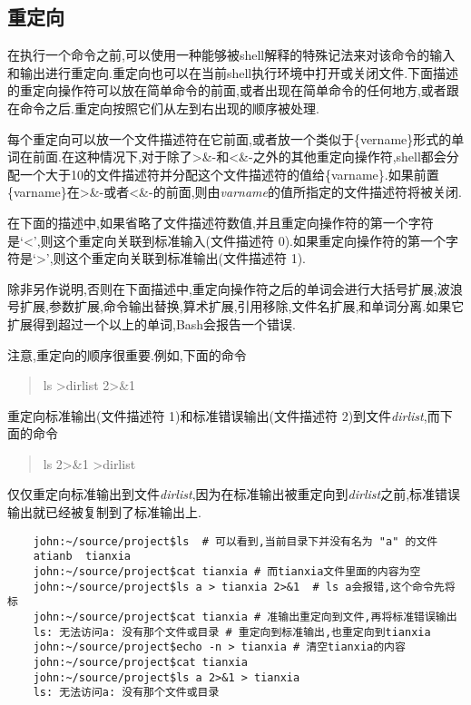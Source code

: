 \documentclass[draft,openany]{book}
\begin{document}
\begin{CJK}{UTF8}{gbsn}
    \section{重定向}
    在执行一个命令之前,可以使用一种能够被shell解释的特殊记法来对该命令的输入和输出进行重定向.重定向也可以在当前shell执行环境中打开或关闭文件.下面描述的重定向操作符可以放在简单命令的前面,或者出现在简单命令的任何地方,或者跟在命令之后.重定向按照它们从左到右出现的顺序被处理.\par
    每个重定向可以放一个文件描述符在它前面,或者放一个类似于\{vername\}形式的单词在前面.在这种情况下,对于除了\textgreater\&-和\textless\&-之外的其他重定向操作符,shell都会分配一个大于10的文件描述符并分配这个文件描述符的值给\{varname\}.如果前置\{varname\}在\textgreater\&-或者\textless\&-的前面,则由\emph{varname}的值所指定的文件描述符将被关闭.\par
    在下面的描述中,如果省略了文件描述符数值,并且重定向操作符的第一个字符是`\textless',则这个重定向关联到标准输入(文件描述符 0).如果重定向操作符的第一个字符是`\textgreater',则这个重定向关联到标准输出(文件描述符 1).\par
    除非另作说明,否则在下面描述中,重定向操作符之后的单词会进行大括号扩展,波浪号扩展,参数扩展,命令输出替换,算术扩展,引用移除,文件名扩展,和单词分离.如果它扩展得到超过一个以上的单词,Bash会报告一个错误.\par
    注意,重定向的顺序很重要.例如,下面的命令
    \begin{quote}
        ls \textgreater dirlist 2\textgreater\&1
    \end{quote}
    重定向标准输出(文件描述符 1)和标准错误输出(文件描述符 2)到文件\emph{dirlist},而下面的命令
    \begin{quote}
        ls 2\textgreater\&1 \textgreater dirlist
    \end{quote}
    仅仅重定向标准输出到文件\emph{dirlist},因为在标准输出被重定向到\emph{dirlist}之前,标准错误输出就已经被复制到了标准输出上.
    \begin{verbatim}
    john:~/source/project$ls  # 可以看到,当前目录下并没有名为 "a" 的文件
    atianb  tianxia
    john:~/source/project$cat tianxia # 而tianxia文件里面的内容为空
    john:~/source/project$ls a > tianxia 2>&1  # ls a会报错,这个命令先将标
    john:~/source/project$cat tianxia # 准输出重定向到文件,再将标准错误输出
    ls: 无法访问a: 没有那个文件或目录 # 重定向到标准输出,也重定向到tianxia
    john:~/source/project$echo -n > tianxia # 清空tianxia的内容
    john:~/source/project$cat tianxia 
    john:~/source/project$ls a 2>&1 > tianxia
    ls: 无法访问a: 没有那个文件或目录

\end{verbatim}
\end{CJK}
\end{document}
